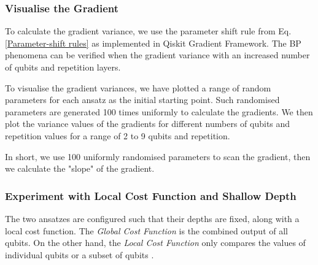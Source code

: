 \subsubsection{Visualise the Gradient}
To calculate the gradient variance, we use the parameter shift rule from Eq. \ref{Parameter-shift rules} as implemented in Qiskit Gradient Framework.
The BP phenomena can be verified when the gradient variance with an increased number of qubits and repetition layers.

To visualise the gradient variances, we have plotted a range of random parameters for each ansatz as the initial starting point.
Such randomised parameters are generated 100 times uniformly to calculate the gradients.
We then plot the variance values of the gradients for different numbers of qubits and repetition values for a range of 2 to 9 qubits and repetition.

In short, we use 100 uniformly randomised parameters to scan the gradient, then we calculate the "slope" of the gradient.

\subsubsection{Experiment with Local Cost Function and Shallow Depth}
The two ansatzes are configured such that their depths are fixed, along with a local cost function.
The \textit{Global Cost Function} is the combined output of all qubits. 
On the other hand, the \textit{Local Cost Function} only compares the values of individual qubits or a subset of qubits \cite{cerezoCostFunctionDependent2021}.